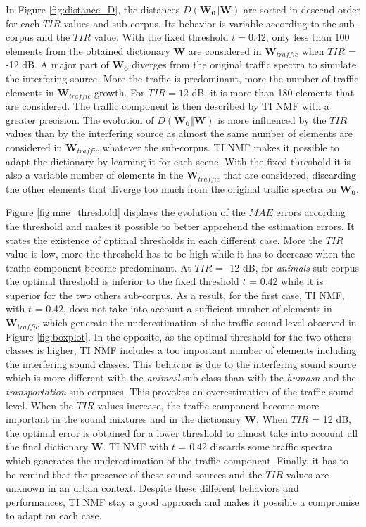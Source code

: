 \documentclass[12pt,english,twoside]{article}
\begin{document}
In Figure \ref{fig:distance_D}, the distances $D(\mathbf{W_0}\Vert \mathbf{W})$ are sorted in descend order for each $TIR$ values and sub-corpus. Its behavior is variable according to the sub-corpus and the $TIR$ value. 
With the fixed threshold $t = 0.42$, only less than 100 elements from the obtained dictionary $\mathbf{W}$ are considered in $\mathbf{W}_{traffic}$ when $TIR$ = -12 dB. A major part of $\mathbf{W_0}$ diverges from the original traffic spectra to simulate the interfering source. More the traffic is predominant, more the number of traffic elements in $\mathbf{W}_{traffic}$ growth. For $TIR = 12$ dB, it is more than 180 elements that are considered. The traffic component is then described by TI NMF with a greater precision. The evolution of $D(\mathbf{W_0}\Vert \mathbf{W})$ is more influenced by the $TIR$ values than by the interfering source as almost the same number of elements are considered in $\mathbf{W}_{traffic}$ whatever the sub-corpus.
TI NMF makes it possible to adapt the dictionary by learning it for each scene. With the fixed threshold it is also a variable number of elements in the $\mathbf{W}_{traffic}$ that are considered,  discarding the other elements that diverge too much from the original traffic spectra on $\mathbf{W_0}$.

Figure \ref{fig:mae_threshold} displays the evolution of the $MAE$ errors according the threshold and makes it possible to better apprehend the estimation errors. It states the existence of optimal thresholds in each different case. More the $TIR$ value is low, more the threshold has to be high while it has to decrease when the traffic component become predominant.
At $TIR$ = -12 dB, for \textit{animals} sub-corpus the optimal threshold is inferior to the fixed threshold $t$ = 0.42 while it is superior for the two others sub-corpus. As a result, for the first case, TI NMF, with $t$ = 0.42, does not take into account a sufficient number of elements in $\mathbf{W}_{traffic}$ which generate the underestimation of the traffic sound level observed in Figure \ref{fig:boxplot}. In the opposite, as the optimal threshold for the two others classes is higher, TI NMF includes a too important number of elements including the interfering sound classes. This behavior is due to the interfering sound source which is more different with the \textit{animasl} sub-class than with the \textit{humasn} and the \textit{transportation} sub-corpuses. This provokes an overestimation of the traffic sound level.
When the $TIR$ values increase, the traffic component become more important in the sound mixtures and in the dictionary $\mathbf{W}$. When $TIR$ = 12 dB, the optimal error is obtained for a lower threshold to almost take into account all the final dictionary $\mathbf{W}$. TI NMF with $t$ = 0.42 discards some traffic spectra which generates the underestimation of the traffic component.  Finally, it has to be remind that the presence of these sound sources and the $TIR$ values are unknown in an urban context. Despite these different behaviors and performances, TI NMF stay a good approach and makes it possible a compromise to adapt on each case.
\end{document}

